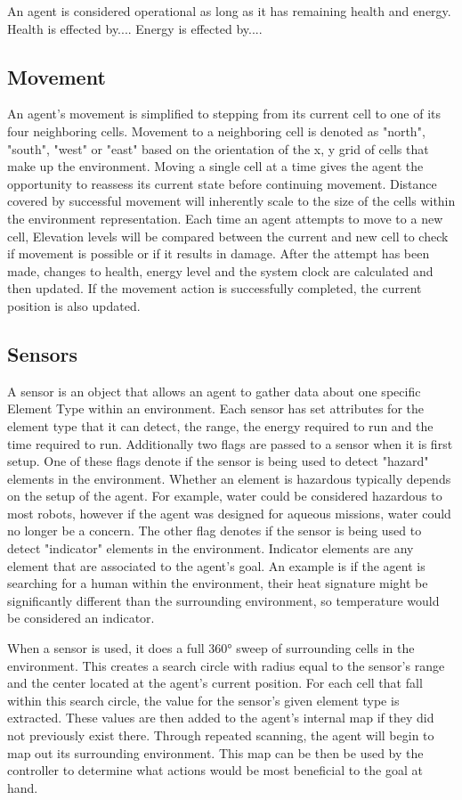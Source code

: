\documentclass[]{report}
\begin{document}
An agent is considered operational as long as it has remaining health and energy.
Health is effected by....
Energy is effected by....

\subsection{Movement}
An agent's movement is simplified to stepping from its current cell to one of its four neighboring cells.
Movement to a neighboring cell is denoted as "north", "south", "west" or "east" based on the orientation of the x, y grid of cells that make up the environment.
Moving a single cell at a time gives the agent the opportunity to reassess its current state before continuing movement.
Distance covered by successful movement will inherently scale to the size of the cells within the environment representation.
Each time an agent attempts to move to a new cell, Elevation levels will be compared between the current and new cell to check if movement is possible or if it results in damage.
After the attempt has been made, changes to health, energy level and the system clock are calculated and then updated.
If the movement action is successfully completed, the current position is also updated.

\subsection{Sensors}
A sensor is an object that allows an agent to gather data about one specific Element Type within an environment.
Each sensor has set attributes for the element type that it can detect, the range, the energy required to run and the time required to run.
Additionally two flags are passed to a sensor when it is first setup.
One of these flags denote if the sensor is being used to detect "hazard" elements in the environment.
Whether an element is hazardous typically depends on the setup of the agent.
For example, water could be considered hazardous to most robots, however if the agent was designed for aqueous missions, water could no longer be a concern.
The other flag denotes if the sensor is being used to detect "indicator" elements in the environment.
Indicator elements are any element that are associated to the agent's goal.
An example is if the agent is searching for a human within the environment, their heat signature might be significantly different than the surrounding environment, so temperature would be considered an indicator.

When a sensor is used, it does a full 360° sweep of surrounding cells in the environment.
This creates a search circle with radius equal to the sensor's range and the center located at the agent's current position.
For each cell that fall within this search circle, the value for the sensor's given element type is extracted.
These values are then added to the agent's internal map if they did not previously exist there.
Through repeated scanning, the agent will begin to map out its surrounding environment.
This map can be then be used by the controller to determine what actions would be most beneficial to the goal at hand.
\end{document}
